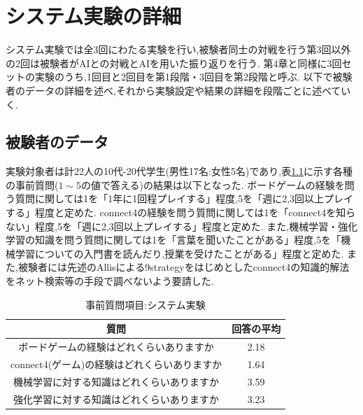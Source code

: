\chapter{システム実験の詳細}
\label{chap:system}
システム実験では全3回にわたる実験を行い,被験者同士の対戦を行う第3回以外の2回は被験者がAIとの対戦とAIを用いた振り返りを行う.
第4章と同様に3回セットの実験のうち,1回目と2回目を第1段階・3回目を第2段階と呼ぶ.
以下で被験者のデータの詳細を述べ,それから実験設定や結果の詳細を段階ごとに述べていく.
\section{被験者のデータ}
実験対象者は計22人の10代-20代学生(男性17名:女性5名)であり,表\ref{table:before}に示す各種の事前質問($1\sim5$の値で答える)の結果は以下となった.
ボードゲームの経験を問う質問に関しては1を「1年に1回程プレイする」程度,5を「週に2,3回以上プレイする」程度と定めた.
connect4の経験を問う質問に関しては1を「connect4を知らない」程度,5を「週に2,3回以上プレイする」程度と定めた.
また,機械学習・強化学習の知識を問う質問に関しては1を「言葉を聞いたことがある」程度,5を「機械学習についての入門書を読んだり,授業を受けたことがある」程度と定めた.
また,被験者には先述のAllis\cite{allis}による9strategyをはじめとしたconnect4の知識的解法をネット検索等の手段で調べないよう要請した.
\begin{table}[H]
    \caption{事前質問項目:システム実験}
    \label{table:before}
	\small
    \begin{tabular}{c||c}
        \multicolumn{1}{c}{質問} & 回答の平均\\ \hline \hline
        ボードゲームの経験はどれくらいありますか & 2.18\\
        connect4(ゲーム)の経験はどれくらいありますか& 1.64\\\hline
        機械学習に対する知識はどれくらいありますか& 3.59\\
        強化学習に対する知識はどれくらいありますか& 3.23\\
    \end{tabular}
    
\end{table}
